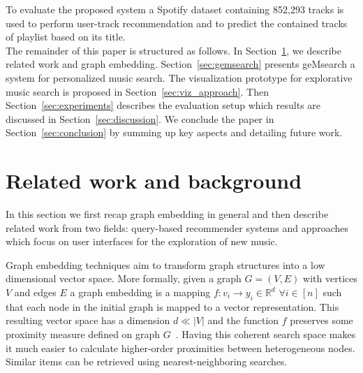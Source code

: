 \documentclass[sigconf]{acmart}
\begin{document}
To evaluate the proposed system a Spotify dataset containing 852,293 tracks is used to perform user-track recommendation and to predict the contained tracks of playlist based on its title. \\


The remainder of this paper is structured as follows. In Section~\ref{sec:relwork}, we describe related work and graph embedding. Section~\ref{sec:gemsearch} presents geMsearch a system for personalized music search. The visualization prototype for  explorative music search is proposed in Section~\ref{sec:viz_approach}. Then Section~\ref{sec:experiments} describes the evaluation setup which results are discussed in Section~\ref{sec:discussion}. We conclude the paper in Section~\ref{sec:conclusion} by summing up key aspects and detailing future work.

\section{Related work and background}
\label{sec:relwork}

In this section we first recap graph embedding in general and then describe related work from two fields: query-based recommender systems and approaches which focus on user interfaces for the exploration of new music. 


Graph embedding techniques aim to transform graph structures into a low dimensional vector space. More formally, given a graph $ G = (V,E) $ with vertices $ V $ and edges $ E $ a graph embedding is a mapping $ f : v_{i} \rightarrow y_{i} \in \mathbb{R}^{d} $ $ \forall i \in [n] $ such that each node in the initial graph is mapped to a vector representation. This resulting vector space has a dimension $ d \ll |V| $ and the function $ f $ preserves some proximity measure defined on graph $ G $~\cite{goyal2017graph}. Having this coherent search space makes it much easier to calculate higher-order proximities between heterogeneous nodes. Similar items can be retrieved using nearest-neighboring searches.
\end{document}

